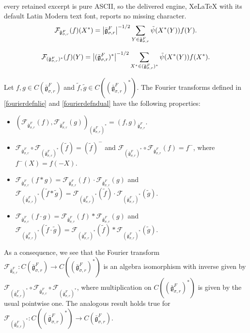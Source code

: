 \documentclass[10pt,a4paper]{amsart}
\newcommand{\bg}{\bar{\mathfrak g}}
\newcommand{\mcF}{\mathcal F}
\begin{document}
every retained excerpt is pure ASCII, so the delivered engine, XeLaTeX with its default Latin Modern text font, reports no missing character.
\begin{equation}\label{fourierdefnlie}
    \mcF_{\bg_{\sigma,r}^F}(f)(X^*)=\left|\bg_{\sigma,r}^F\right|^{-1/2}\sum_{Y\in \bg_{\sigma,r}^F}\Tilde\psi( X^*(Y))f(Y).
\end{equation}

\begin{equation}\label{fourierdefndual}
  \mcF_{(\bg_{\sigma,r}^F)^*}(f)(Y)=\left|(\bg_{\sigma,r}^F)^*\right|^{-1/2}\sum_{X^*\in (\bg_{\sigma,r}^F)^*}\Tilde\psi( X^*(Y))f(X^*).
\end{equation}

\begin{proposition}\label{fourierprop}
    Let  $f,g \in C\left(\bg_{\sigma,r}^F\right)$ and $\tilde f, \tilde g \in C\left((\bg_{\sigma,r}^F)^*\right)$. The Fourier transforms defined in \eqref{fourierdefnlie} and \eqref{fourierdefndual} have the following properties:
    \begin{itemize}
        \item[(i)]  $\left(\mcF_{\bg_{\sigma,r}^F}(f),\mcF_{\bg_{\sigma,r}^F}(g)\right)_{(\bg_{\sigma,r}^F)^*}= \left(f,g\right)_{\bg_{\sigma,r}^F}$. 
        \item [(ii)]  $\mcF_{\bg_{\sigma,r}^F}\circ \mcF_{(\bg_{\sigma,r}^F)^*}(\tilde f) = (\tilde f)^-$ and $ \mcF_{(\bg_{\sigma,r}^F)^*}\circ\mcF_{\bg_{\sigma,r}^F}(f)=f^-$, where $f^-(X)=f(-X)$. 
        \item[(iii)]  $\mcF_{\bg_{\sigma,r}^F}(f*g)= \mcF_{\bg_{\sigma,r}^F}(f)\cdot \mcF_{\bg_{\sigma,r}^F}(g)$ and $\mcF_{(\bg_{\sigma,r}^F)^*} (\tilde f*\tilde g )=\mcF_{(\bg_{\sigma,r}^F)^*} (\tilde f) \cdot \mcF_{(\bg_{\sigma,r}^F)^*}(\tilde g) $.
        \item[(iv)] $\mcF_{\bg_{\sigma,r}^F}(f\cdot g)= \mcF_{\bg_{\sigma,r}^F}(f)* \mcF_{\bg_{\sigma,r}^F}(g)$ and $\mcF_{(\bg_{\sigma,r}^F)^*} (\tilde f\cdot \tilde g )=\mcF_{(\bg_{\sigma,r}^F)^*} (\tilde f) * \mcF_{(\bg_{\sigma,r}^F)^*}(\tilde g)$.
    \end{itemize}
    As a consequence, we see that the Fourier transform $\mcF_{\bg_{\sigma,r}^F}:C(\bg_{\sigma,r}^F) \longrightarrow C\left((\bg_{\sigma,r}^F)^*\right)$ is an algebra isomorphism with inverse given by $\mcF_{(\bg_{\sigma,r}^F)^*}\circ \mcF_{\bg_{\sigma,r}^F}\circ \mcF_{(\bg_{\sigma,r}^F)^*}$, where multiplication on $C\left((\bg_{\sigma,r}^F)^*\right)$ is given by the usual pointwise one. The analogous result holds true for  $\mcF_{(\bg_{\sigma,r}^F)^*}:C\left((\bg_{\sigma,r}^F)^*\right) \longrightarrow C(\bg_{\sigma,r}^F) $.
\end{proposition}
\end{document}
